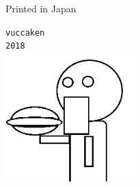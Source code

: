 \documentclass[11pt,b5paper,papersize,dvipdfmx]{jsbook}
\begin{document}
\par \vspace{0.5zw}
\hrulefill \par
Printed in Japan

\newpage 
\quad \thispagestyle{empty}
\newpage
\newpage 
\quad \thispagestyle{empty}
\newpage


\clearpage

%
\thispagestyle{empty}
%
\begin{minipage}{0.88\hsize}
  \begin{center}
    \vspace{23zw}
    {\fontsize{18}{0}\selectfont \tt vuccaken}\\
    \vspace{1zw}
    {\fontsize{18}{0}\selectfont \tt 2018}\\
    \vspace{7zw}
    \includegraphics[width=5cm]{07lunch-music.png}
  \end{center}
\end{minipage}
%
\begin{minipage}{0.07\hsize}
  \quad
\end{minipage}



\end{document}
